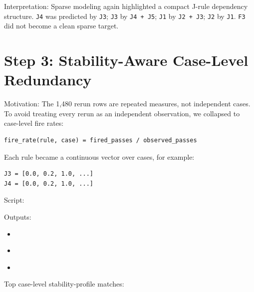 \documentclass[11pt]{article}
\begin{document}
Interpretation: Sparse modeling again highlighted a compact J-rule dependency structure. \texttt{J4} was predicted by \texttt{J3}; \texttt{J3} by \texttt{J4 + J5}; \texttt{J1} by \texttt{J2 + J3}; \texttt{J2} by \texttt{J1}. \texttt{F3} did not become a clean sparse target.

\section*{Step 3: Stability-Aware Case-Level Redundancy}

Motivation: The 1,480 rerun rows are repeated measures, not independent cases. To avoid treating every rerun as an independent observation, we collapsed to case-level fire rates:

\begin{verbatim}
fire_rate(rule, case) = fired_passes / observed_passes
\end{verbatim}

Each rule became a continuous vector over cases, for example:

\begin{verbatim}
J3 = [0.0, 0.2, 1.0, ...]
J4 = [0.0, 0.2, 1.0, ...]
\end{verbatim}

Script:

\href{../scripts/analyze_rule_stability_profiles.py}{}

Outputs:

\begin{itemize}[leftmargin=1.5em]
  \item \href{../results/case_rule_fire_rates_reruns.csv}{}
  \item \href{../results/stability_profile_pairs_reruns.csv}{}
  \item \href{../results/stability_profile_implications_reruns.csv}{}
\end{itemize}

Top case-level stability-profile matches:
\end{document}
